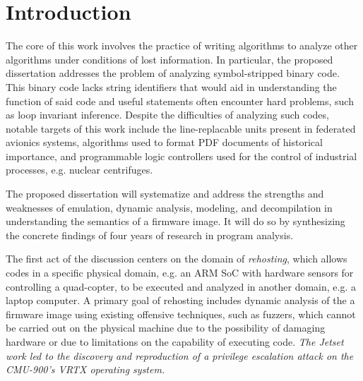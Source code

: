 \newenvironment{prettylist}{
	\begin{list}{
		\footnotesize\raisebox{0pt}{\small\ding{121}}
	}{
		\setlength\topsep{2pt plus 1pt minus 1pt}
		\setlength\leftmargin{2em}
		\setlength\rightmargin{0pt}
		\setlength\itemsep{1pt plus.1pt}
		\setlength\parskip{0pt}
		\setlength\parsep{0pt}
		\setlength\itemindent{0pt}
	}
}{
	\end{list}
}

\section{Introduction}
\label{intro}

The core of this work involves the practice of writing algorithms to analyze other algorithms under conditions of lost information.
In particular, the proposed dissertation addresses the problem of analyzing symbol-stripped binary code. 
This binary code lacks string identifiers that would aid in understanding the function of said code and useful statements often encounter hard problems, such as loop invariant inference.
Despite the difficulties of analyzing such codes, notable targets of this work include the line-replacable units present in federated avionics systems, algorithms used to format PDF documents of historical importance, and programmable logic controllers used for the control of industrial processes, e.g. nuclear centrifuges.

The proposed dissertation will systematize and address the strengths and weaknesses of emulation, dynamic analysis, modeling, and decompilation in understanding the semantics of a firmware image. 
It will do so by synthesizing the concrete findings of four years of research in program analysis.

The first act of the discussion centers on the domain of \emph{rehosting}, which allows codes in a specific physical domain, e.g. an ARM SoC with hardware sensors for controlling a quad-copter, to be executed and analyzed in another domain, e.g. a laptop computer.
A primary goal of rehosting includes dynamic analysis of the a firmware image using existing offensive techniques, such as fuzzers, which cannot be carried out on the physical machine due to the possibility of damaging hardware or due to limitations on the capability of executing code.
\emph{The Jetset work led to the discovery and reproduction of a privilege escalation attack on the CMU-900's VRTX operating system.}

